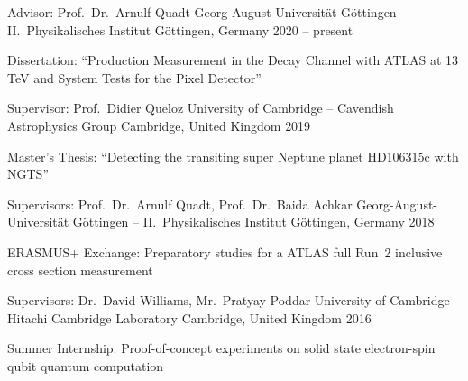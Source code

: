 

\begin{cventries}

  \cventry
    {Advisor: Prof.\ Dr.\ Arnulf Quadt} %
    {Georg-August-Universit\"at G\"ottingen -- II.\ Physikalisches Institut} %
    {G\"ottingen, Germany} %
    {2020 -- present} %
    {%
      \begin{cvitems} %
        \item {%
          Dissertation:%
          ``\ttH Production Measurement in the \Hbb Decay Channel with ATLAS at 13\,TeV\newline
          and System Tests for the Pixel Detector''
        }
      \end{cvitems}
    }

  \cventry
    {Supervisor: Prof.\ Didier Queloz} %
    {University of Cambridge -- Cavendish Astrophysics Group} %
    {Cambridge, United Kingdom} %
    {2019} %
    {%
      \begin{cvitems} %
        \item {Master's Thesis: ``Detecting the transiting super Neptune planet HD106315c with NGTS''}
      \end{cvitems}
    }

  \cventry
    {Supervisors: Prof.\ Dr.\ Arnulf Quadt, Prof.\ Dr.\ Baida Achkar} %
    {Georg-August-Universit\"at G\"ottingen -- II.\ Physikalisches Institut} %
    {G\"ottingen, Germany} %
    {2018} %
    {%
      \begin{cvitems} %
        \item {ERASMUS+ Exchange: Preparatory studies for a ATLAS full Run~2 \ttbar inclusive cross section measurement}
      \end{cvitems}
    }

  \cventry
    {Supervisors: Dr.\ David Williams, Mr.\ Pratyay Poddar} %
    {University of Cambridge -- Hitachi Cambridge Laboratory} %
    {Cambridge, United Kingdom} %
    {2016} %
    {%
      \begin{cvitems} %
        \item {Summer Internship: Proof-of-concept experiments on solid state electron-spin qubit quantum computation}
      \end{cvitems}
    }

\end{cventries}
